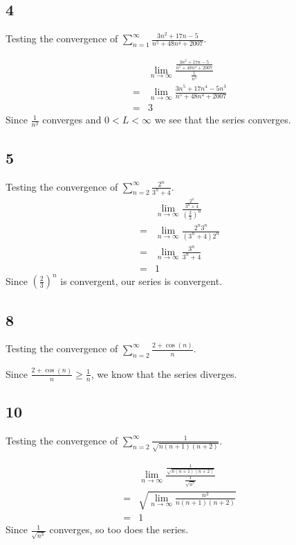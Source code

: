 \documentclass[12pt]{article}
\newcommand{\round}[1]{\left(       #1 \right)      }
\begin{document}
\subsection*{4}
Testing the convergence of $\sum_{n=1}^\infty \frac{3n^2 + 17n - 5}{n^5 + 48n^4 + 2007}$.

\begin{align*}
     & \lim_{n\to\infty} \frac{\frac{3n^2 + 17n - 5}{n^5 + 48n^4 + 2007}}{\frac{1}{n^3}} \\
    =& \lim_{n\to\infty} \frac{3n^5 + 17n^4 - 5n^3}{n^5 + 48n^4 + 2007} \\
    =& 3
\end{align*}
Since $\frac{1}{n^3}$ converges and $0<L<\infty$ we see that the series converges.



\subsection*{5}
Testing the convergence of $\sum_{n=2}^\infty \frac{2^n}{3^n + 4}$.
\begin{align*}
     & \lim_{n\to\infty} \frac{\frac{2^n}{3^n+4}}{\round{\frac{2}{3}}^n} \\
    =& \lim_{n\to\infty} \frac{2^n 3^n}{(3^n + 4)2^n} \\
    =& \lim_{n\to\infty} \frac{3^n}{3^n + 4} \\
    =& 1
\end{align*}
Since $\round{\frac{2}{3}}^n$ is convergent, our series is convergent.



\subsection*{8}
Testing the convergence of $\sum_{n=2}^\infty \frac{2 + \cos(n)}{n}$.

Since $\frac{2+\cos(n)}{n} \geq \frac{1}{n}$, we know that the series diverges.



\subsection*{10}
Testing the convergence of $\sum_{n=2}^\infty \frac{1}{\sqrt{n(n+1)(n+2)}}$.

\begin{align*}
     & \lim_{n\to\infty} \frac{\frac{1}{\sqrt{n(n+1)(n+2)}}}{\frac{1}{\sqrt{n^3}}} \\
    =& \sqrt{\lim_{n\to\infty} \frac{n^3}{n(n+1)(n+2)}} \\
    =& 1
\end{align*}
Since $\frac{1}{\sqrt{n^3}}$ converges, so too does the series.
\end{document}
